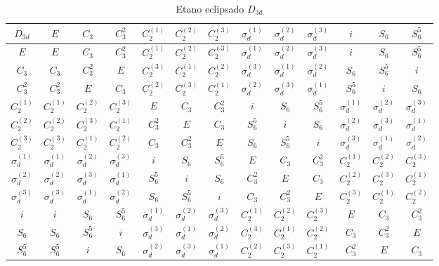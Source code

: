 \documentclass[a4paper,10pt]{article}
\begin{document}
\begin{table}[ht]
\caption{Etano eclipsado $D_{3d}$}
\centering

\begin{tabular} { |c|c c c c c c c c c c c c | }
\hline
$D_{3d}$ & $E$ & $C_3$ & $C_3^2$ & $C_2^{(1)}$ & $C_2^{(2)}$ & $C_2^{(3)}$ & $\sigma_d^{(1)}$ & $\sigma_d^{(2)}$ & $\sigma_d^{(3)}$ & $i$ & $S_6$ & $S_6^5$ \\
\hline
$E$ & $E$ & $C_3$ & $C_3^2$ & $C_2^{(1)}$ & $C_2^{(2)}$ & $C_2^{(3)}$ & $\sigma_d^{(1)}$ & $\sigma_d^{(2)}$ & $\sigma_d^{(3)}$ & $i$ & $S_6$ & $S_6^5$ \\
$C_3$ & $C_3$ & $C_3^2$ & $E$ & $C_2^{(3)}$ & $C_2^{(1)}$ & $C_2^{(2)}$ & $\sigma_d^{(3)}$ & $\sigma_d^{(1)}$ & $\sigma_d^{(2)}$ & $S_6$ & $S_6^5$ & $i$ \\
$C_3^2$ & $C_3^2$ & $E$ & $C_3$ & $C_2^{(2)}$ & $C_2^{(3)}$ & $C_2^{(1)}$ & $\sigma_d^{(2)}$ & $\sigma_d^{(3)}$ & $\sigma_d^{(1)}$ & $S_6^5$ & $i$ & $S_6$ \\
$C_2^{(1)}$ & $C_2^{(1)}$ & $C_2^{(2)}$ & $C_2^{(3)}$ & $E$ & $C_3$ & $C_3^2$ & $i$ & $S_6$ & $S_6^5$ & $\sigma_d^{(1)}$ & $\sigma_d^{(2)}$ & $\sigma_d^{(3)}$ \\
$C_2^{(2)}$ & $C_2^{(2)}$ & $C_2^{(3)}$ & $C_2^{(1)}$ & $C_3^2$ & $E$ & $C_3$ & $S_6^5$ & $i$ & $S_6$ & $\sigma_d^{(2)}$ & $\sigma_d^{(3)}$ & $\sigma_d^{(1)}$ \\
$C_2^{(3)}$ & $C_2^{(3)}$ & $C_2^{(1)}$ & $C_2^{(2)}$ & $C_3$ & $C_3^2$ & $E$ & $S_6$ & $S_6^5$ & $i$ & $\sigma_d^{(3)}$ & $\sigma_d^{(1)}$ & $\sigma_d^{(2)}$ \\
$\sigma_d^{(1)}$ & $\sigma_d^{(1)}$ & $\sigma_d^{(2)}$ & $\sigma_d^{(3)}$ & $i$ & $S_6$ & $S_6^5$ & $E$ & $C_3$ & $C_3^2$ & $C_2^{(1)}$ & $C_2^{(2)}$ & $C_2^{(3)}$ \\
$\sigma_d^{(2)}$ & $\sigma_d^{(2)}$ & $\sigma_d^{(3)}$ & $\sigma_d^{(1)}$ & $S_6^5$ & $i$ & $S_6$ & $C_3^2$ & $E$ & $C_3$ & $C_2^{(2)}$ & $C_2^{(3)}$ & $C_2^{(1)}$ \\
$\sigma_d^{(3)}$ & $\sigma_d^{(3)}$ & $\sigma_d^{(1)}$ & $\sigma_d^{(2)}$ & $S_6$ & $S_6^5$ & $i$ & $C_3$ & $C_3^2$ & $E$ & $C_2^{(3)}$ & $C_2^{(1)}$ & $C_2^{(2)}$ \\
$i$ & $i$ & $S_6$ & $S_6^5$ & $\sigma_d^{(1)}$ & $\sigma_d^{(2)}$ & $\sigma_d^{(3)}$ & $C_2^{(1)}$ & $C_2^{(2)}$ & $C_2^{(3)}$ & $E$ & $C_3$ & $C_3^2$ \\
$S_6$ & $S_6$ & $S_6^5$ & $i$ & $\sigma_d^{(3)}$ & $\sigma_d^{(1)}$ & $\sigma_d^{(2)}$ & $C_2^{(3)}$ & $C_2^{(1)}$ & $C_2^{(2)}$ & $C_3$ & $C_3^2$ & $E$ \\
$S_6^5$ & $S_6^5$ & $i$ & $S_6$ & $\sigma_d^{(2)}$ & $\sigma_d^{(3)}$ & $\sigma_d^{(1)}$ & $C_2^{(2)}$ & $C_2^{(3)}$ & $C_2^{(1)}$ & $C_3^2$ & $E$ & $C_3$ \\
\hline
\end{tabular}

\label{tab:mult}
\end{table}
\end{document}
